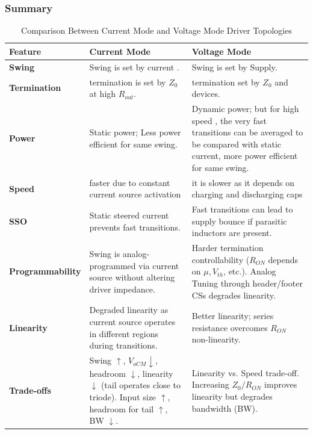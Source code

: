  \subsubsection{Summary} \label{ssubsec:Summary}
\begin{table}[htbp]
    \centering
    \caption{Comparison Between Current Mode and Voltage Mode Driver Topologies}
    \label{tab:driver_comparison}
    \begin{tabularx}{\textwidth}{l X X}
        \toprule
        \textbf{Feature} & \textbf{Current Mode} & \textbf{Voltage Mode} \\
        \midrule
        \textbf{Swing} & Swing is set by current . & Swing is set by Supply. \\
        \addlinespace
        \textbf{Termination} & termination is set by $Z_0$ at high $R_{out}$. &  termination set by $Z_0$ and devices. \\
        \addlinespace
        \textbf{Power} & Static power; Less power efficient for same swing. & Dynamic power;  but for high speed , the very fast transitions can be averaged to be compared with static current,  more power efficient for same swing. \\
        \addlinespace
        \textbf{Speed} & faster due to constant current source activation  &  it is slower as it depends on charging and discharging caps \\        

        \addlinespace
        \textbf{SSO} & Static steered current prevents fast transitions. & Fast transitions can lead to supply bounce if parasitic inductors are present. \\
        \addlinespace
        \textbf{Programmability} & Swing is analog-programmed via current source without altering driver impedance. & Harder termination controllability ($R_{ON}$ depends on $\mu, V_{th}$, etc.). Analog Tuning through header/footer CSs degrades linearity. \\
        \addlinespace
        \textbf{Linearity} & Degraded linearity as current source operates in different regions during transitions. & Better linearity; series resistance overcomes $R_{ON}$ non-linearity. \\
        \addlinespace
        \textbf{Trade-offs} & Swing $\uparrow$, $V_{oCM} \downarrow$, headroom $\downarrow$, linearity $\downarrow$ (tail operates close to triode). Input size $\uparrow$, headroom for tail $\uparrow$, BW $\downarrow$. & Linearity vs. Speed trade-off. Increasing $Z_0/R_{ON}$ improves linearity but degrades bandwidth (BW). \\
        \bottomrule
    \end{tabularx}
\end{table}
